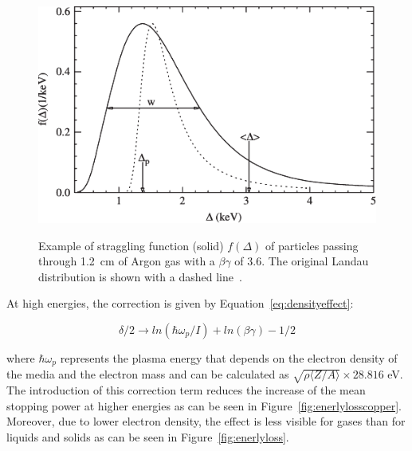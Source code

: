 \endgroup
	
\begingroup\setlength{\intextsep}{20pt}\setlength{\columnsep}{15pt}
	
	\begin{figure}
		\centering
		\includegraphics[width = \linewidth]{fig/chapt3/Straggling-gas.pdf}\\
		\caption{\label{fig:straggling-gas} Example of straggling function (solid) $f(\Delta)$ of particles passing through \SI{1.2}{cm} of Argon gas with a $\beta\gamma$ of 3.6. The original Landau distribution is shown with a dashed line~\cite{BISCHEL2006}.}
	\end{figure}
	
	At high energies, the correction is given by Equation~\ref{eq:densityeffect}:
	
	\begin{equation}
	\label{eq:densityeffect}
	\delta/2 \longrightarrow ln(\hbar\omega_p/I) + ln(\beta\gamma) - 1/2
	\end{equation}
	
	where $\hbar\omega_p$ represents the plasma energy that depends on the electron density of the media and the electron mass and can be calculated as $\sqrt{\rho\langle Z/A \rangle} \times 28.816$ \si{eV}. The introduction of this correction term reduces the increase of the mean stopping power at higher energies as can be seen in Figure~\ref{fig:enerlylosscopper}. Moreover, due to lower electron density, the effect is less visible for gases than for liquids and solids as can be seen in Figure~\ref{fig:enerlyloss}.
	
\endgroup
	
\begingroup\setlength{\intextsep}{5pt}\setlength{\columnsep}{15pt}
	

